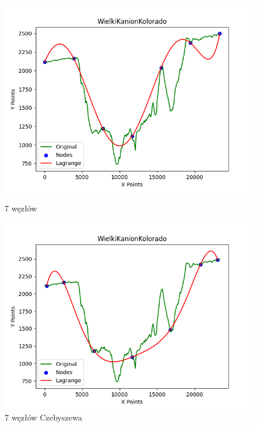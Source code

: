 \documentclass{article}
\begin{document}
\begin{figure}[H]
    \centering
    \begin{minipage}[b]{0.49\textwidth}
        \centering
        \includegraphics[width=\textwidth]{plots/WielkiKanionKolorado_lagrange_7.png}
        \caption{7 węzłów}
        \label{fig:7nodes}
    \end{minipage}
    \hfill
    \begin{minipage}[b]{0.49\textwidth}
        \centering
        \includegraphics[width=\textwidth]{plots/WielkiKanionKolorado_lagrange_7_True.png}
        \caption{7 węzłów Czebyszewa}
        \label{fig:7nodes}
    \end{minipage}
\end{figure}
\end{document}
